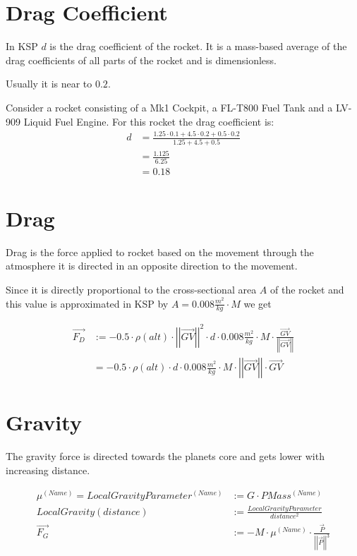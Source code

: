 \documentclass[11pt]{article}
\newcommand{\oa}[1]{\overrightarrow{#1}}
\newcommand{\F}[1]{\oa{F_{#1}}}
\newcommand{\Pos}{\oa{P}}
\newcommand{\absvec}[1]{\left|\left|{#1}\right|\right|}
\begin{document}
\section{Drag Coefficient}

In KSP $d$ is the drag coefficient of the rocket. It is a mass-based
average of the drag coefficients of all parts of the rocket and is
dimensionless.

Usually it is near to $0.2$.

Consider a rocket consisting of a Mk1 Cockpit, a FL-T800 Fuel Tank and
a LV-909 Liquid Fuel Engine. For this rocket the drag coefficient is:
\begin{align}
  d &= \frac{1.25 \cdot 0.1 + 4.5 \cdot 0.2 + 0.5 \cdot 0.2}{ 1.25 + 4.5 + 0.5 }\nonumber\\
  &= \frac{1.125}{6.25}\nonumber\\
  &= 0.18\nonumber
\end{align}

\section{Drag}

Drag is the force applied to rocket based on the movement through the
atmosphere it is directed in an opposite direction to the movement.

Since it is directly proportional to the cross-sectional area $A$ of
the rocket and this value is approximated in KSP by $A = 0.008
\frac{m^2}{kg} \cdot M$ we get

\begin{align}
  \F{D} &:= - 0.5 \cdot \rho(alt)\cdot \absvec{\oa{GV}}^2\cdot d \cdot 0.008\frac{m^2}{kg} \cdot M \cdot \frac{\oa{GV}}{\absvec{\oa{GV}}} \nonumber\\
  &= - 0.5 \cdot \rho(alt)\cdot d \cdot 0.008\frac{m^2}{kg} \cdot M \cdot \absvec{\oa{GV}} \cdot \oa{GV}
\end{align}

\section{Gravity}

The gravity force is directed towards the planets core and gets lower
with increasing distance.

\begin{align}
  \mu^{(Name)} = LocalGravityParameter^{(Name)} &:= G \cdot PMass^{(Name)} \nonumber\\
  LocalGravity(distance) &:= \frac{LocalGravityParameter}{distance^2}\nonumber\\
  \F{G} &:= - M \cdot \mu^{(Name)}\cdot\frac{\Pos}{\absvec{\Pos}^3}
\end{align}
\end{document}
